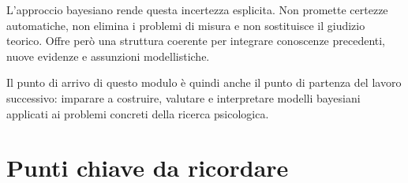 \documentclass[
  italian,
  letterpaper,
  a4paper,
  11pt,
  open=any]{scrbook}
\theoremstyle{plain}
\theoremstyle{definition}
\theoremstyle{definition}
\theoremstyle{remark}
\begin{document}
L'approccio bayesiano rende questa incertezza esplicita. Non promette
certezze automatiche, non elimina i problemi di misura e non sostituisce
il giudizio teorico. Offre però una struttura coerente per integrare
conoscenze precedenti, nuove evidenze e assunzioni modellistiche.

Il punto di arrivo di questo modulo è quindi anche il punto di partenza
del lavoro successivo: imparare a costruire, valutare e interpretare
modelli bayesiani applicati ai problemi concreti della ricerca
psicologica.

\section*{Punti chiave da ricordare}\label{punti-chiave-da-ricordare-15}

\end{document}
